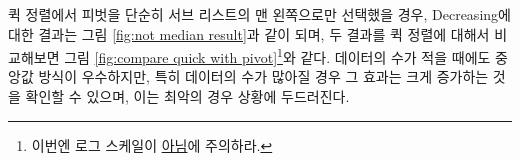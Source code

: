 \documentclass{article}
\begin{document}
퀵 정렬에서 피벗을 단순히 서브 리스트의 맨 왼쪽으로만 선택했을 경우, Decreasing에 대한 결과는 그림 \ref{fig:not median result}과 같이 되며, 두 결과를 퀵 정렬에 대해서 비교해보면 그림 \ref{fig:compare quick with pivot}\footnote{이번엔 로그 스케일이 \underline{아님}에 주의하라.}와 같다. 데이터의 수가 적을 때에도 중앙값 방식이 우수하지만, 특히 데이터의 수가 많아질 경우 그 효과는 크게 증가하는 것을 확인할 수 있으며, 이는 최악의 경우 상황에 두드러진다.
\end{document}
